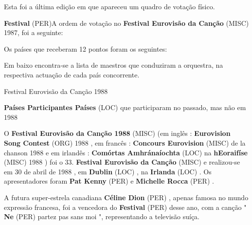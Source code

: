 \documentclass[12pt,a4paper]{article}
\begin{document}
Esta foi a última edição em que apareceu um quadro de votação físico.



\textbf{Festival} (PER)A ordem de votação no \textbf{Festival Eurovisão da Canção} (MISC) 1987, foi a seguinte:

Os países que receberam 12 pontos foram os seguintes:

Em baixo encontra-se a lista de maestros que conduziram a orquestra, na respectiva actuação de cada país concorrente.



Festival Eurovisão da Canção 1988



\textbf{Países Participantes Países} (LOC) que participaram no passado, mas não em 1988

O \textbf{Festival Eurovisão da Canção 1988} (MISC) (em inglês : \textbf{Eurovision Song Contest} (ORG) 1988 , em francês : \textbf{Concours Eurovision} (MISC) de la chanson 1988 e em irlandês : \textbf{Comórtas Amhránaíochta} (LOC) na \textbf{hEoraifíse} (MISC) 1988 ) foi o 33. \textbf{Festival Eurovisão da Canção} (MISC) e realizou-se em 30 de abril de 1988 , em \textbf{Dublin} (LOC) , na \textbf{Irlanda} (LOC) . Os apresentadores foram \textbf{Pat Kenny} (PER) e \textbf{Michelle Rocca} (PER) .

A futura super-estrela canadiana \textbf{Céline Dion} (PER) , apenas famosa no mundo expressão francesa, foi a vencedora do \textbf{Festival} (PER) desse ano, com a canção " \textbf{Ne} (PER) partez pas sans moi ", representando a televisão suíça.
\end{document}
